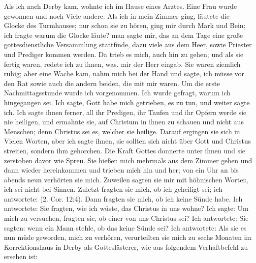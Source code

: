 Als ich nach Derby kam, wohnte ich im Hause eines Arztes.
Eine Frau wurde gewonnen und noch Viele andere. Als ich in
mein Zimmer ging, läutete die Glocke des Turmhauses; nur schon
sie zu hören, ging mir durch Mark und Bein; ich fragte warum
die Glocke läute? man sagte mir, das an dem Tage eine große
gottesdienstliche Versammlung stattfinde, dazu viele aus dem
Heer, sowie Priester und Prediger kommen werden. Da trieb
es mich, auch hin zu gehen; und als sie fertig waren, redete ich
zu ihnen, was. mir der Herr eingab. Sie waren ziemlich ruhig;
aber eine Wache kam, nahm mich bei der Hand und sagte, ich
müsse vor den Rat sowie auch die andern beiden, die mit mir
waren. Um die erste Nachmittagsstunde wurde ich vorgenommen.
Ich wurde gefragt, warum ich hingegangen sei. Ich sagte, Gott
habe mich getrieben, es zu tun, und weiter sagte ich.  Ich sagte ihnen
ferner, all ihr Predigen, ihr Taufen und ihr Opfern werde sie
nie heiligen, und ermahnte sie, auf Christum in ihnen zu schauen
und nicht aus Menschen; denn Christus sei es, welcher sie heilige.
Darauf ergingen sie sich in Vielen Worten, aber ich sagte ihnen,
sie sollten sich nicht über Gott und Christus streiten, sondern
ihm gehorchen. Die Kraft Gottes donnerte unter ihnen und
sie zerstoben davor wie Spreu. Sie hießen mich mehrmals
aus dem Zimmer gehen und dann wieder hereinkommen und
trieben mich hin und her; von ein Uhr an bis abends neun 
verhörten sie mich. Zuweilen sagten sie mir mit höhnischen Worten,
ich sei nicht bei Sinnen. Zuletzt fragten sie mich, ob ich 
geheiligt
sei; ich antwortete: 
(2. Cor. 12:4). Dann fragten 
sie mich, ob ich keine Sünde habe.
Ich antwortete:  Sie fragten, wie ich
wüste, das Christus in uns wohne? Ich sagte:  Um mich zu versuchen, fragten sie,
ob einer von uns Christus sei? Ich antwortete:  Sie sagten: wenn ein Mann
stehle, ob das keine Sünde sei? Ich antwortete:  Als sie es nun müde geworden, mich zu verhören,
verurteilten sie mich zu sechs Monaten im Korrektionshaus in
Derby als Gotteslästerer, wie aus folgendem Verhaftbefehl zu
ersehen ist:

